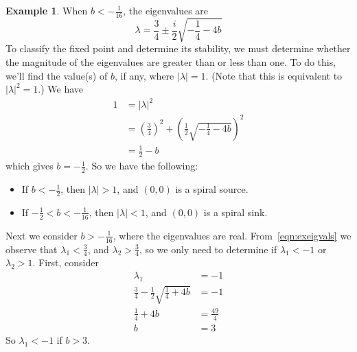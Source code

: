 \documentclass[reqno]{immbook}
\numberwithin{equation}{chapter}
\numberwithin{question}{section}
\numberwithin{theorem}{chapter}
\numberwithin{figure}{chapter}
\theoremstyle{definition}
\newtheorem{example}{Example}[section]
\begin{document}
\begin{example}
When $b < -\frac{1}{16}$, the eigenvalues are
\begin{equation}
   \lambda = \frac{3}{4} \pm \frac{i}{2}\sqrt{-\frac{1}{4}-4b}
\end{equation}
To classify the fixed point and determine its stability,
we must determine whether the magnitude of the eigenvalues
are greater than or less than one.  To do this, we'll find the
value(s) of $b$, if any, where $|\lambda| = 1$.
(Note that this is equivalent to $|\lambda|^2 = 1$.)
We have
\begin{equation}
\begin{split}
  1 & = |\lambda|^2 \\
    & = \left(\frac{3}{4}\right)^2 + \left(\frac{1}{2}\sqrt{-\frac{1}{4}-4b} \right)^2 \\
    & = \frac{1}{2} - b
\end{split}
\end{equation}
which gives $b=-\frac{1}{2}$.
So we have the following:
\begin{itemize}
\item
If $b < -\frac{1}{2}$, then $|\lambda| > 1$, and $(0,0)$ is a spiral source.
\item
If $-\frac{1}{2} < b < -\frac{1}{16}$, then $|\lambda| < 1$, and $(0,0)$
is a spiral sink.
\end{itemize}
Next we consider $b > -\frac{1}{16}$, where the eigenvalues are real.
From~\eqref{eqn:exeigvals} we observe that $\lambda_1 < \frac{3}{4}$,
and $\lambda_2 > \frac{3}{4}$, so we only need to determine
if $\lambda_1 < -1$ or  $\lambda_2 > 1$.
First, consider
\begin{equation}
\begin{split}
   \lambda_1 & = -1 \\
   \frac{3}{4} - \frac{1}{2} \sqrt{\frac{1}{4}+4b} & = -1 \\
   \frac{1}{4}+4b & = \frac{49}{4} \\
   b & = 3
\end{split}
\end{equation}
So $\lambda_1 < -1$ if $b > 3$.


\end{example}
\end{document}
